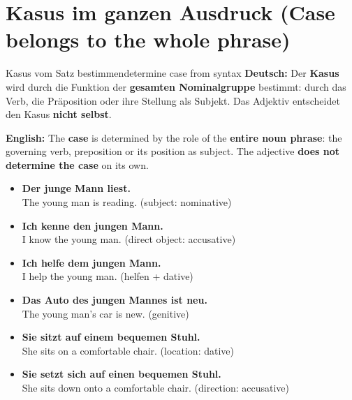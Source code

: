 \documentclass[a4paper,11pt]{article}
\newcommand{\GermanText}[1]{\textbf{Deutsch: }#1\par}
\newcommand{\EnglishText}[1]{{\small\color{SoftGray}\textbf{English: }#1\par}}
\newcommand{\ExampleItem}[2]{\item \textbf{#1}\\{\small\color{SoftGray}#2}}
\begin{document}
\section{Kasus im ganzen Ausdruck \textnormal{(Case belongs to the whole phrase)}}
\begin{grammarentry}{Kasus vom Satz bestimmen}{determine case from syntax}
\GermanText{Der \textbf{Kasus} wird durch die Funktion der \textbf{gesamten Nominalgruppe} bestimmt: durch das Verb, die Präposition oder ihre Stellung als Subjekt. Das Adjektiv entscheidet den Kasus \textbf{nicht selbst}.}
\EnglishText{The \textbf{case} is determined by the role of the \textbf{entire noun phrase}: the governing verb, preposition or its position as subject. The adjective \textbf{does not determine the case} on its own.}
\end{grammarentry}
\begin{exbox}\begin{itemize}
\ExampleItem{Der junge Mann liest.}{The young man is reading. (subject: nominative)}
\ExampleItem{Ich kenne den jungen Mann.}{I know the young man. (direct object: accusative)}
\ExampleItem{Ich helfe dem jungen Mann.}{I help the young man. (helfen + dative)}
\ExampleItem{Das Auto des jungen Mannes ist neu.}{The young man's car is new. (genitive)}
\ExampleItem{Sie sitzt auf einem bequemen Stuhl.}{She sits on a comfortable chair. (location: dative)}
\ExampleItem{Sie setzt sich auf einen bequemen Stuhl.}{She sits down onto a comfortable chair. (direction: accusative)}
\end{itemize}\end{exbox}
\end{document}
